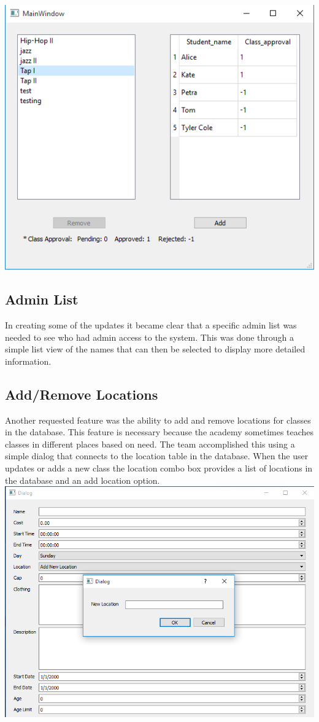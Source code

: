 \includegraphics[scale=0.5]{newAddStudent.png}

\subsection{Admin List}
In creating some of the updates it became clear that a specific admin list was needed to see who had admin access to the system. This was done through a simple list view of the names that can then be selected to display more detailed information.\\


\subsection{Add/Remove Locations}
Another requested feature was the ability to add and remove locations for classes in the database. This feature is necessary because the academy sometimes teaches classes in different places based on need. The team accomplished this using a simple dialog that connects to the location table in the database. When the user updates or adds a new class the location combo box provides a list of locations in the database and an add location option.\\

\includegraphics[scale=0.5]{newLocation.png}


